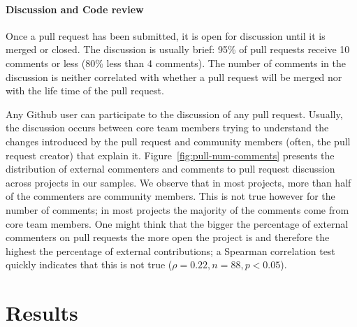 \documentclass{acm_proc_article-sp}
\begin{document}
\paragraph*{Discussion and Code review}

Once a pull request has been submitted, it is open for discussion until
it is merged or closed. The discussion is usually brief: 95\% of pull
requests receive 10 comments or less (80\% less than 4 comments). 
The number of comments in the discussion is neither correlated with
whether a pull request will be merged nor with the life time of the
pull request.

Any Github user can participate to the discussion of any pull request. Usually,
the discussion occurs between core team members trying to understand the changes
introduced by the pull request and community members (often, the pull
request creator) that explain it. Figure~\ref{fig:pull-num-comments} presents
the distribution of external commenters and comments to pull request discussion
across projects in our samples. We observe that in most projects, more than half
of the commenters are community members. This is not true however for the number
of comments; in most projects the majority of the comments come from core team
members. One might think that the bigger the percentage of external commenters
on pull requests the more open the project is and therefore the highest the
percentage of external contributions; a Spearman correlation test quickly
indicates that this is not true ($\rho = 0.22, n = 88, p < 0.05$).

\section{Results}
\label{sec:accrej}
\end{document}
